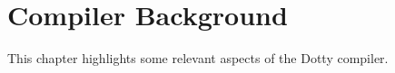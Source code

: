 \documentclass[11pt]{report}
\begin{document}
\begin{comment}
One major question I pursued in the present work was how best to encode mutability information into the Dotty type system. Rather than encoding mutability information as a type system separate from the host language's type system, I thought it important to look for an integrated approach that (where possible) relies on the host language's type system to perform some of the ``heavy lifiting.'' 

Much previous work on reference immutability and side effects has entailed the development of new reference-immutability-specific or effect-encoding type systems. For example, Reim~\cite{} introduces a system of type qualifiers that are orthogonal to Java types, and Rytz's work on effect systems for Scala~\cite{} involves intraprocedural analysis and typing rules that are essentially independent of Scala's type system.

However, there is a problem with the creation of type systems orthogonal to the host language's type system: as the complexity of the host language and the new type system increases, there is a very real risk of substantial duplication of development effort. The Scala language, DOT type system, and Dotty compiler support a degree of modularity, flexibility, and practicality that is unprecedented among statically-typed languages, but at the cost of a very long and difficult development process. For a new type system to approach the complexity ...

\end{comment}




\chapter{Compiler Background} \label{chap:dotty-compiler-background}

This chapter highlights some relevant aspects of the Dotty compiler.

\begin{comment}
The Dotty type system can be confusing, particularly to beginners.
There is currently little to no documentation about many parts of the compiler,
so here I will highlight some of the ideas and implementation details of Dotty
that are relevant to the present work.

First, I will discuss certain elements of the type system.
Dotty (roughly) divides types into two categories: type types and term types.
Key type types and term types are discussed in sections~\ref{sec:type-types} through \ref{sec:term-types}.
\end{comment}
\end{document}
